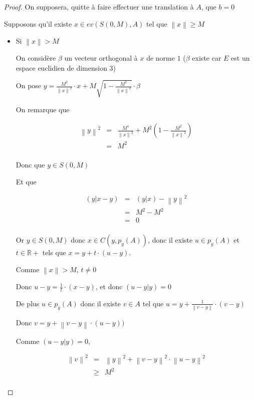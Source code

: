 \documentclass[a4paper]{article}
\newcommand{\norm}[1]{\left\lVert#1\right\rVert}
\begin{document}
\begin{proof}

On supposera, quitte à faire effectuer une translation à $A$, que $b = 0$

Supposons qu'il existe $x \in ev(S(0,M), A)$ tel que $\norm{x} \geqslant M$

\begin{itemize}
\item Si $\norm{x} > M$ 

On considère $\beta$ un vecteur orthogonal à $x$ de norme $1$ ($\beta$ existe car $E$ est un espace euclidien de dimension $3$)

On pose $y = \frac{M^{2}}{\norm{x}^{2}} \cdot x + M \sqrt{1 - \frac{M^{2}}{\norm{x}^{2}}} \cdot \beta$

On remarque que 

\[\begin{array}{ccl}
\norm{y}^{2} & = & \frac{M^{4}}{\norm{x}^{2}} + M^{2} (1 -\frac{M^{2}}{\norm{x}^{2}}) \\
             & = &  M^{2}\\
\end{array}\]

Donc que $y \in S(0, M)$

Et que

\[\begin{array}{ccl}
(y|x - y) & = & (y|x) - \norm{y}^{2}\\
          & = & M^{2} - M^{2}\\
          & = & 0\\
\end{array}\]

Or $y \in S(0, M)$ donc $x \in C(y, p_{y}(A))$, donc il existe $u\in p_{y}(A)$ et $t\in \mathbb{R}+$ tels que $x = y + t \cdot (u - y)$.

Comme $\norm{x} > M$, $t\neq 0$

Donc $u - y = \frac{1}{t} \cdot (x - y)$, et donc $(u - y|y) = 0$

De plus $u \in p_{y}(A)$ donc il existe $v \in A$ tel que $u = y + \frac{1}{\norm{v -  y}} \cdot (v - y)$

Donc $v = y + \norm{v - y} \cdot (u - y))$

Comme $(u - y|y) = 0$,

\[\begin{array}{ccl}
\norm{v}^{2} & = & \norm{y}^{2} + \norm{v - y}^{2} \cdot \norm{u - y}^{2} \\
     & \geqslant & M^{2} \\
\end{array}\]



\end{itemize}
\end{proof}
\end{document}
